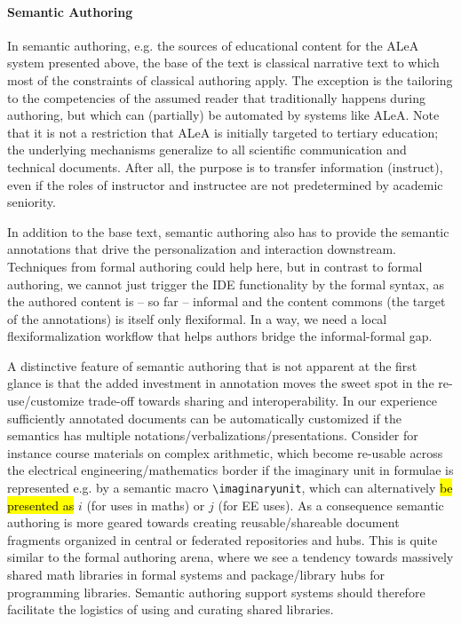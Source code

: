 \documentclass[runningheads]{llncs}
\def\edited#1{\hl{#1}}
\newcommand\ALeA{\textsf{ALeA}\xspace}
\begin{document}
\paragraph{Semantic Authoring}
In semantic authoring, e.g. the \sTeX sources of educational content for the \ALeA system
presented above, the base of the text is classical narrative text to which most of the
constraints of classical authoring apply.
The exception is the tailoring to the competencies of the assumed reader
that traditionally happens during authoring, but which can (partially) be automated by systems like
\ALeA. Note that it is not a restriction that \ALeA is initially targeted to tertiary
education; the underlying mechanisms generalize to all scientific communication and
technical documents. After all, the purpose is to transfer information (instruct), even if
the roles of instructor and instructee are not predetermined by academic seniority.

In addition to the base text, semantic authoring also has to provide the semantic
annotations that drive the personalization and interaction downstream. Techniques from formal
authoring could help here, but in contrast to formal authoring, we cannot just trigger the
IDE functionality by the formal syntax, as the authored content is -- so far -- informal
and the content commons (the target of the annotations) is itself only flexiformal. In a
way, we need a local flexiformalization workflow that helps authors bridge the
informal-formal gap.

A distinctive feature of semantic authoring that is not apparent at the first glance is
that the added investment in annotation moves the sweet spot in the re-use/customize
trade-off towards sharing and interoperability. In our experience sufficiently annotated
documents can be automatically customized if the semantics has multiple
notations/verbalizations/presentations. Consider for instance course materials on complex
arithmetic, which become re-usable across the electrical engineering/mathematics border if
the imaginary unit in formulae is represented e.g. by a semantic macro
\lstinline|\imaginaryunit|, which can alternatively \edited{be presented as} $i$ (for uses in maths) or
$j$ (for EE uses). As a consequence semantic authoring is more geared towards creating
reusable/shareable document fragments organized in central or federated repositories and
hubs. This is quite similar to the formal authoring arena, where we see a tendency towards
massively shared math libraries in formal systems and package/library hubs for programming
libraries. Semantic authoring support systems should therefore facilitate the
logistics of using and curating shared libraries.
\end{document}
